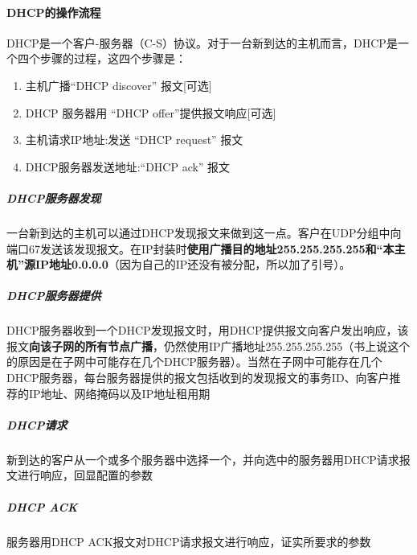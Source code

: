 \documentclass[]{report}
\begin{document}
			\paragraph{DHCP的操作流程}
			DHCP是一个客户-服务器（C-S）协议。对于一台新到达的主机而言，DHCP是一个四个步骤的过程，这四个步骤是：
			\begin{enumerate}
				\item 主机广播“DHCP discover” 报文[可选]
				\item DHCP 服务器用 “DHCP offer”提供报文响应[可选]
				\item 主机请求IP地址:发送 “DHCP request” 报文
				\item DHCP服务器发送地址:“DHCP ack” 报文
			\end{enumerate}\par
				\subparagraph{DHCP服务器发现}
				一台新到达的主机可以通过DHCP发现报文来做到这一点。客户在UDP分组中向端口67发送该发现报文。在IP封装时\textbf{使用广播目的地址255.255.255.255和“本主机”源IP地址0.0.0.0}（因为自己的IP还没有被分配，所以加了引号）。
				\subparagraph{DHCP服务器提供}
				DHCP服务器收到一个DHCP发现报文时，用DHCP提供报文向客户发出响应，该报文\textbf{向该子网的所有节点广播}，仍然使用IP广播地址255.255.255.255（书上说这个的原因是在子网中可能存在几个DHCP服务器）。当然在子网中可能存在几个DHCP服务器，每台服务器提供的报文包括收到的发现报文的事务ID、向客户推荐的IP地址、网络掩码以及IP地址租用期
				\subparagraph{DHCP请求}
				新到达的客户从一个或多个服务器中选择一个，并向选中的服务器用DHCP请求报文进行响应，回显配置的参数
				\subparagraph{DHCP ACK}
				服务器用DHCP ACK报文对DHCP请求报文进行响应，证实所要求的参数
\end{document}
